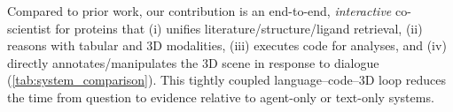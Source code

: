 \documentclass{article}
\begin{document}

Compared to prior work, our contribution is an end-to-end, \emph{interactive} co-scientist for proteins that (i) unifies literature/structure/ligand retrieval, (ii) reasons with tabular and 3D modalities, (iii) executes code for analyses, and (iv) directly annotates/manipulates the 3D scene in response to dialogue (\cref{tab:system_comparison}). This tightly coupled language–code–3D loop reduces the time from question to evidence relative to agent-only or text-only systems.
\end{document}
